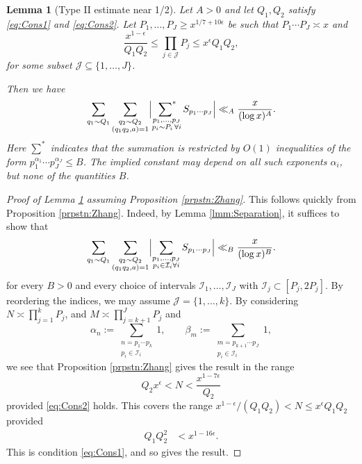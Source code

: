 \documentclass[10pt]{amsart}
\theoremstyle{plain}
\newtheorem{lmm}[thrm]{Lemma}
\numberwithin{equation}{section}
\begin{document}
\begin{lmm}[Type II estimate near 1/2]\label{lmm:ZhangTypeII}
Let $A>0$ and let $Q_1,Q_2$ satisfy \eqref{eq:Cons1} and \eqref{eq:Cons2}. Let $P_1,\dots,P_J\ge x^{1/7+10\epsilon}$ be such that $P_1\cdots P_J\asymp x$ and
\[
\frac{x^{1-\epsilon}}{Q_1Q_2}\le \prod_{j\in \mathcal{J}}P_j\le x^\epsilon Q_1Q_2,
\]
for some subset $\mathcal{J}\subseteq\{1,\dots,J\}$.

Then we have
\[
\sum_{q_1\sim Q_1}\sum_{\substack{q_2\sim Q_2\\ (q_1q_2,a)=1}}\Bigl|\mathop{\sideset{}{^*}\sum}_{\substack{p_1,\dots,p_J\\ p_i\sim P_i\,\forall i}}S_{p_1\cdots p_J}\Bigr|\ll_A\frac{x}{(\log{x})^A}.
\]
Here $\sum^*$ indicates that the summation is restricted by $O(1)$ inequalities of the form $p_1^{\alpha_1}\cdots p_J^{\alpha_J}\le B$.  The implied constant may depend on all such exponents $\alpha_i$, but none of the quantities $B$.
\end{lmm}
%
%
%
%
\begin{proof}[Proof of Lemma \ref{lmm:ZhangTypeII} assuming Proposition \ref{prpstn:Zhang}]
This follows quickly from Proposition \ref{prpstn:Zhang}. Indeed, by Lemma \ref{lmm:Separation}, it suffices to show that
\[
\sum_{q_1\sim Q_1}\sum_{\substack{q_2\sim Q_2\\ (q_1q_2,a)=1}}\Bigl|\sum_{\substack{p_1,\dots,p_J\\ p_i\in \mathcal{I}_i\forall i}}S_{p_1\cdots p_J}\Bigr|\ll_{B}\frac{x}{(\log{x})^{B}}.
\]
for every $B>0$ and every choice of intervals $\mathcal{I}_1,\dots,\mathcal{I}_J$ with $\mathcal{I}_j\subset[P_j,2P_j]$. By reordering the indices, we may assume $\mathcal{J}=\{1,\dots,k\}$. By considering $N\asymp \prod_{j=1}^k P_j$, and $M\asymp \prod_{j=k+1}^{J}P_j$ and
\[
\alpha_n:=\sum_{\substack{n=p_1\cdots p_k\\ p_i\in \mathcal{I}_i}}1,\qquad \beta_m:=\sum_{\substack{m=p_{k+1}\cdots p_J\\ p_i\in \mathcal{I}_i}}1,
\]
we see that Proposition \ref{prpstn:Zhang} gives the result in the range
\[
Q_2x^\epsilon<N<\frac{x^{1-7\epsilon}}{Q_2}
\]
provided \eqref{eq:Cons2} holds. This covers the range $x^{1-\epsilon}/(Q_1Q_2)<N\le x^\epsilon Q_1 Q_2$ provided
\begin{align*}
Q_1Q_2^2&<x^{1-16\epsilon}.
\end{align*}
This is condition \eqref{eq:Cons1}, and so gives the result.
\end{proof}
%
%
%
%
\end{document}
